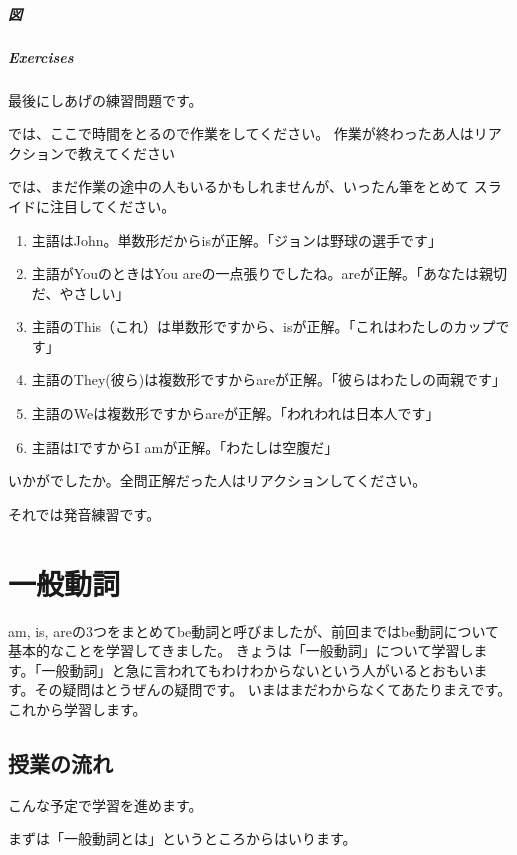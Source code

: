\documentclass[book,jafontscale=0.9247]{jlreq}
\newcommand{\mySagyo}{%
\par%
\bigskip
では、ここで時間をとるので作業をしてください。
作業が終わったあ人はリアクションで教えてください\par%
\begin{minipage}[t]{.98\textwidth}
\mbox{}\hrulefill\mbox{}\par%
\mbox{}\hfill{}\raisebox{-.5\height}{作業}\hfill\mbox{}\par%
\mbox{}\hrulefill\mbox{}
\end{minipage}%
\par%
\bigskip%
では、まだ作業の途中の人もいるかもしれませんが、いったん筆をとめて
スライドに注目してください。%
\par%
\bigskip
}
\newcommand{\myMouse}{%
  {\large \ComputerMouse}
}
\begin{document}
\paragraph{図}

\paragraph{Exercises}

最後にしあげの練習問題です。

\mySagyo

\begin{enumerate}
 \item 主語はJohn。単数形だからisが正解。「ジョンは野球の選手です」
 \item 主語がYouのときはYou areの一点張りでしたね。areが正解。「あなたは親切だ、やさしい」
 \item 主語のThis（これ）は単数形ですから、isが正解。「これはわたしのカップです」
 \item 主語のThey(彼ら)は複数形ですからareが正解。「彼らはわたしの両親です」
 \item 主語のWeは複数形ですからareが正解。「われわれは日本人です」
 \item 主語はIですからI amが正解。「わたしは空腹だ」

\end{enumerate}

いかがでしたか。全問正解だった人はリアクションしてください。


それでは発音練習です。

\chapter{一般動詞}

am, is, areの3つをまとめてbe動詞と呼びましたが、前回まではbe動詞について基本的なことを学習してきました。
きょうは「一般動詞」について学習します。「一般動詞」と急に言われてもわけわからないという人がいるとおもいます。その疑問はとうぜんの疑問です。
いまはまだわからなくてあたりまえです。これから学習します。\myMouse

\section{授業の流れ}

こんな予定で学習を進めます。

まずは「一般動詞とは」というところからはいります。
\end{document}
